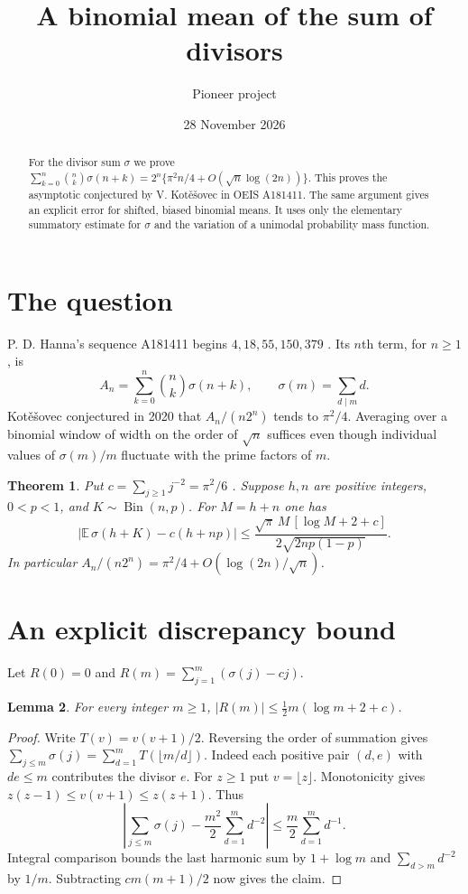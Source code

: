 \documentclass[11pt,letterpaper]{article}
\title{A binomial mean of the sum of divisors}
\author{Pioneer project}
\date{28 November 2026}
\newtheorem{theorem}{Theorem}
\newtheorem{lemma}[theorem]{Lemma}
\newcommand{\E}{\mathbb E}
\DeclareMathOperator{\Bin}{Bin}
\begin{document}
\maketitle
\begin{abstract}
For the divisor sum $\sigma$ we prove
$\sum_{k=0}^{n}\binom{n}{k}\sigma(n+k)
=2^n\{\pi^2 n/4+O(\sqrt n\log(2n))\}$.
This proves the asymptotic conjectured by V. Kot\v e\v sovec in OEIS A181411.
The same argument gives an explicit error for shifted, biased binomial means.
It uses only the elementary summatory estimate for $\sigma$ and the variation
of a unimodal probability mass function.
\end{abstract}

\section{The question}
P. D. Hanna's sequence A181411 begins $4,18,55,150,379$ \cite{entry}.
Its $n$th term, for $n\ge1$, is
\[
 A_n=\sum_{k=0}^n\binom{n}{k}\sigma(n+k),\qquad
 \sigma(m)=\sum_{d\mid m}d.
\]
Kot\v e\v sovec conjectured in 2020 that $A_n/(n2^n)$ tends to $\pi^2/4$.
Averaging over a binomial window of width on the order of $\sqrt n$ suffices
even though individual values of $\sigma(m)/m$ fluctuate with the prime factors of $m$.

\begin{theorem}\label{th:main}
Put $c=\sum_{j\ge1}j^{-2}=\pi^2/6$ \cite{basel}. Suppose $h,n$ are positive integers,
$0<p<1$, and $K\sim\Bin(n,p)$. For $M=h+n$ one has
\[
 \left|\E\,\sigma(h+K)-c(h+np)\right|
 \le \frac{\sqrt{\pi}\,M\,[\log M+2+c]}
                {2\sqrt{2np(1-p)}}.
\]
In particular $A_n/(n2^n)=\pi^2/4+O(\log(2n)/\sqrt n)$.
\end{theorem}

\section{An explicit discrepancy bound}
Let $R(0)=0$ and $R(m)=\sum_{j=1}^m (\sigma(j)-cj)$.
\begin{lemma}\label{lem:sigma}
For every integer $m\ge1$,
$|R(m)|\le \tfrac12m(\log m+2+c)$.
\end{lemma}
\begin{proof}
Write $T(v)=v(v+1)/2$. Reversing the order of summation gives
$\sum_{j\le m}\sigma(j)=\sum_{d=1}^m T(\lfloor m/d\rfloor)$.
Indeed each positive pair $(d,e)$ with $de\le m$ contributes the divisor $e$.
For $z\ge1$ put $v=\lfloor z\rfloor$. Monotonicity gives
$z(z-1)\le v(v+1)\le z(z+1)$. Thus
\[
 \left|\sum_{j\le m}\sigma(j)-\frac{m^2}{2}\sum_{d=1}^m d^{-2}\right|
  \le \frac m2\sum_{d=1}^m d^{-1}.
\]
Integral comparison bounds the last harmonic sum by $1+\log m$ and
$\sum_{d>m}d^{-2}$ by $1/m$. Subtracting $cm(m+1)/2$ now gives the claim.
\end{proof}
\end{document}
